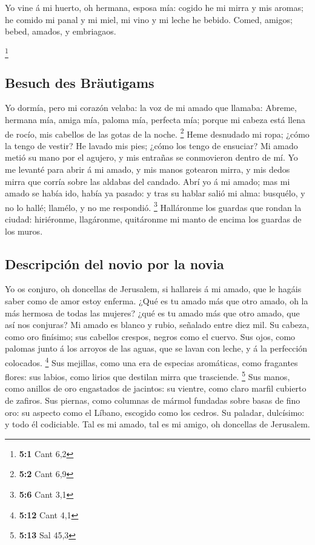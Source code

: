  Yo vine á mi huerto, oh hermana, esposa mía: cogido he mi
mirra y mis aromas; he comido mi panal y mi miel, mi vino y mi leche he
bebido. Comed, amigos; bebed, amados, y embriagaos.

\footnote{\textbf{5:1} Cant 6,2}

\hypertarget{besuch-des-bruxe4utigams}{%
\subsection{Besuch des Bräutigams}\label{besuch-des-bruxe4utigams}}

 Yo dormía, pero mi corazón velaba: la voz de mi amado que
llamaba: Abreme, hermana mía, amiga mía, paloma mía, perfecta mía;
porque mi cabeza está llena de rocío, mis cabellos de las gotas de la
noche. \footnote{\textbf{5:2} Cant 6,9}  Heme desnudado mi
ropa; ¿cómo la tengo de vestir? He lavado mis pies; ¿cómo los tengo de
ensuciar?  Mi amado metió su mano por el agujero, y mis
entrañas se conmovieron dentro de mí.  Yo me levanté para
abrir á mi amado, y mis manos gotearon mirra, y mis dedos mirra que
corría sobre las aldabas del candado.  Abrí yo á mi amado;
mas mi amado se había ido, había ya pasado: y tras su hablar salió mi
alma: busquélo, y no lo hallé; llamélo, y no me respondió. \footnote{\textbf{5:6}
  Cant 3,1}  Halláronme los guardas que rondan la ciudad:
hiriéronme, llagáronme, quitáronme mi manto de encima los guardas de los
muros.

\hypertarget{descripciuxf3n-del-novio-por-la-novia}{%
\subsection{Descripción del novio por la
novia}\label{descripciuxf3n-del-novio-por-la-novia}}

 Yo os conjuro, oh doncellas de Jerusalem, si hallareis á mi
amado, que le hagáis saber como de amor estoy enferma.  ¿Qué
es tu amado más que otro amado, oh la más hermosa de todas las mujeres?
¿qué es tu amado más que otro amado, que así nos conjuras? 
Mi amado es blanco y rubio, señalado entre diez mil.  Su
cabeza, como oro finísimo; sus cabellos crespos, negros como el cuervo.
 Sus ojos, como palomas junto á los arroyos de las aguas,
que se lavan con leche, y á la perfección colocados. \footnote{\textbf{5:12}
  Cant 4,1}  Sus mejillas, como una era de especias
aromáticas, como fragantes flores: sus labios, como lirios que destilan
mirra que trasciende. \footnote{\textbf{5:13} Sal 45,3} 
Sus manos, como anillos de oro engastados de jacintos: su vientre, como
claro marfil cubierto de zafiros.  Sus piernas, como
columnas de mármol fundadas sobre basas de fino oro: su aspecto como el
Líbano, escogido como los cedros.  Su paladar, dulcísimo: y
todo él codiciable. Tal es mi amado, tal es mi amigo, oh doncellas de
Jerusalem.

